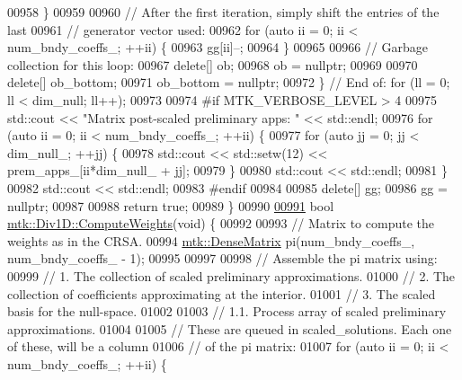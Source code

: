 \begin{DoxyCode}
{{00958     \}
00959 
00960     \textcolor{comment}{// After the first iteration, simply shift the entries of the last}
00961     \textcolor{comment}{// generator vector used:}
00962     \textcolor{keywordflow}{for} (\textcolor{keyword}{auto} ii = 0; ii < num\_bndy\_coeffs\_; ++ii) \{
00963       gg[ii]--;
00964     \}
00965 
00966     \textcolor{comment}{// Garbage collection for this loop:}
00967     \textcolor{keyword}{delete}[] ob;
00968     ob = \textcolor{keyword}{nullptr};
00969 
00970     \textcolor{keyword}{delete}[] ob\_bottom;
00971     ob\_bottom = \textcolor{keyword}{nullptr};
00972   \} \textcolor{comment}{// End of: for (ll = 0; ll < dim\_null; ll++);}
00973 
00974 \textcolor{preprocessor}{  #if MTK\_VERBOSE\_LEVEL > 4}
00975   std::cout << \textcolor{stringliteral}{"Matrix post-scaled preliminary apps: "} << std::endl;
00976   \textcolor{keywordflow}{for} (\textcolor{keyword}{auto} ii = 0; ii < num\_bndy\_coeffs\_; ++ii) \{
00977     \textcolor{keywordflow}{for} (\textcolor{keyword}{auto} jj = 0; jj < dim\_null\_; ++jj) \{
00978       std::cout << std::setw(12) << prem\_apps\_[ii*dim\_null\_ + jj];
00979     \}
00980     std::cout << std::endl;
00981   \}
00982   std::cout << std::endl;
00983 \textcolor{preprocessor}{  #endif}
00984 
00985   \textcolor{keyword}{delete}[] gg;
00986   gg = \textcolor{keyword}{nullptr};
00987 
00988   \textcolor{keywordflow}{return} \textcolor{keyword}{true};
00989 \}
00990 
\hypertarget{mtk__div__1d_8cc_source_l00991}{}\hyperlink{classmtk_1_1Div1D_aaadd6a6e6836bb94841c4c35dffab828}{00991} \textcolor{keywordtype}{bool} \hyperlink{classmtk_1_1Div1D_aaadd6a6e6836bb94841c4c35dffab828}{mtk::Div1D::ComputeWeights}(\textcolor{keywordtype}{void}) \{
00992 
00993   \textcolor{comment}{// Matrix to compute the weights as in the CRSA.}
00994   \hyperlink{classmtk_1_1DenseMatrix}{mtk::DenseMatrix} pi(num\_bndy\_coeffs\_, num\_bndy\_coeffs\_ - 1);
00995 
00997 
00998   \textcolor{comment}{// Assemble the pi matrix using:}
00999   \textcolor{comment}{// 1. The collection of scaled preliminary approximations.}
01000   \textcolor{comment}{// 2. The collection of coefficients approximating at the interior.}
01001   \textcolor{comment}{// 3. The scaled basis for the null-space.}
01002 
01003   \textcolor{comment}{// 1.1. Process array of scaled preliminary approximations.}
01004 
01005   \textcolor{comment}{// These are queued in scaled\_solutions. Each one of these, will be a column}
01006   \textcolor{comment}{// of the pi matrix:}
01007   \textcolor{keywordflow}{for} (\textcolor{keyword}{auto} ii = 0; ii < num\_bndy\_coeffs\_; ++ii) \{
}}
\end{DoxyCode}
